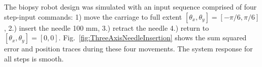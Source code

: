  The biopsy robot design was simulated with an input sequence comprised of four step-input commands: 1) move the carriage to full extent $[\theta_x,\theta_y] = [-\pi/6,\pi/6]$, 2.) insert the needle 100 mm, 3.) retract the needle 4.)  return to $[\theta_x,\theta_y] = [0,0]$.   Fig.~\ref{fig:ThreeAxisNeedleInsertion} shows the sum squared error and position traces during these four movements.  The system response for all steps is smooth.
 





